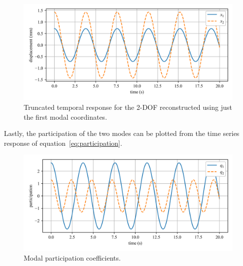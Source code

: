 \documentclass[12pt,letter]{article}
\begin{document}
\begin{example}
	\begin{figure}[H]
		\centering
		\includegraphics[width=\linewidth]{../figures/modal_analysis_free_vibration_truncated.png}
		\caption{Truncated temporal response for the 2-DOF reconstructed using just the first modal coordinates.}
		\label{fig:modal_analysis_free_vibration_truncated}
	\end{figure}
	
	Lastly, the participation of the two modes can be plotted from the time series response of equation~\ref{eq:participation}.
	
	\begin{figure}[H]
		\centering
		\includegraphics[width=\linewidth]{../figures/modal_analysis_free_participation_factors.png}
		\caption{Modal participation coefficients.}
		\label{fig:modal_analysis_free_participation_factors}
	\end{figure}
	
	
	
	\end{example}
	
	
\end{document}
